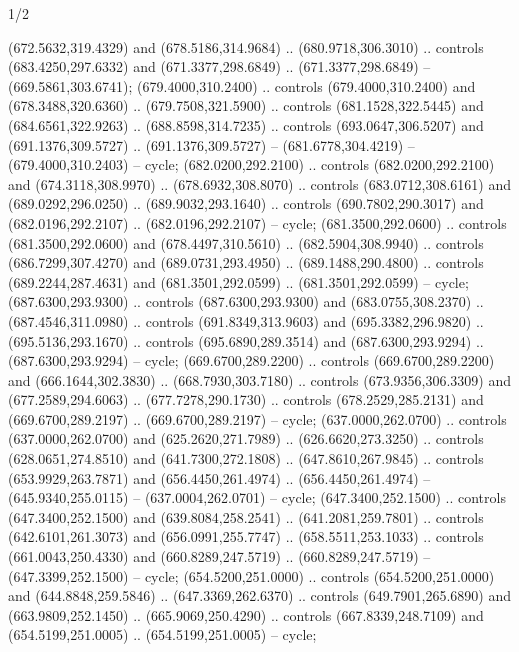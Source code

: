 \begin{flagdescription}{1/2}
\begin{scope}[xshift=0.5\flaglength,yshift=0.5\flagwidth,scale=\flagwidth/759]
\begin{scope}[y=0.8pt, x=0.8pt, yscale=-1,shift={(-720,-480)}]
\begin{scope}[draw=black,fill=c452c25,line width=0.438\lw]
  (672.5632,319.4329) and (678.5186,314.9684) .. (680.9718,306.3010) .. controls
  (683.4250,297.6332) and (671.3377,298.6849) .. (671.3377,298.6849) --
  (669.5861,303.6741);
 (679.4000,310.2400) .. controls (679.4000,310.2400) and
  (678.3488,320.6360) .. (679.7508,321.5900) .. controls (681.1528,322.5445) and
  (684.6561,322.9263) .. (688.8598,314.7235) .. controls (693.0647,306.5207) and
  (691.1376,309.5727) .. (691.1376,309.5727) -- (681.6778,304.4219) --
  (679.4000,310.2403) -- cycle;
 (682.0200,292.2100) .. controls (682.0200,292.2100) and
  (674.3118,308.9970) .. (678.6932,308.8070) .. controls (683.0712,308.6161) and
  (689.0292,296.0250) .. (689.9032,293.1640) .. controls (690.7802,290.3017) and
  (682.0196,292.2107) .. (682.0196,292.2107) -- cycle;
 (681.3500,292.0600) .. controls (681.3500,292.0600) and
  (678.4497,310.5610) .. (682.5904,308.9940) .. controls (686.7299,307.4270) and
  (689.0731,293.4950) .. (689.1488,290.4800) .. controls (689.2244,287.4631) and
  (681.3501,292.0599) .. (681.3501,292.0599) -- cycle;
 (687.6300,293.9300) .. controls (687.6300,293.9300) and
  (683.0755,308.2370) .. (687.4546,311.0980) .. controls (691.8349,313.9603) and
  (695.3382,296.9820) .. (695.5136,293.1670) .. controls (695.6890,289.3514) and
  (687.6300,293.9294) .. (687.6300,293.9294) -- cycle;
 (669.6700,289.2200) .. controls (669.6700,289.2200) and
  (666.1644,302.3830) .. (668.7930,303.7180) .. controls (673.9356,306.3309) and
  (677.2589,294.6063) .. (677.7278,290.1730) .. controls (678.2529,285.2131) and
  (669.6700,289.2197) .. (669.6700,289.2197) -- cycle;
 (637.0000,262.0700) .. controls (637.0000,262.0700) and
  (625.2620,271.7989) .. (626.6620,273.3250) .. controls (628.0651,274.8510) and
  (641.7300,272.1808) .. (647.8610,267.9845) .. controls (653.9929,263.7871) and
  (656.4450,261.4974) .. (656.4450,261.4974) -- (645.9340,255.0115) --
  (637.0004,262.0701) -- cycle;
 (647.3400,252.1500) .. controls (647.3400,252.1500) and
  (639.8084,258.2541) .. (641.2081,259.7801) .. controls (642.6101,261.3073) and
  (656.0991,255.7747) .. (658.5511,253.1033) .. controls (661.0043,250.4330) and
  (660.8289,247.5719) .. (660.8289,247.5719) -- (647.3399,252.1500) -- cycle;
 (654.5200,251.0000) .. controls (654.5200,251.0000) and
  (644.8848,259.5846) .. (647.3369,262.6370) .. controls (649.7901,265.6890) and
  (663.9809,252.1450) .. (665.9069,250.4290) .. controls (667.8339,248.7109) and
  (654.5199,251.0005) .. (654.5199,251.0005) -- cycle;

\end{scope}
\end{scope}
\end{scope}
\end{flagdescription}

